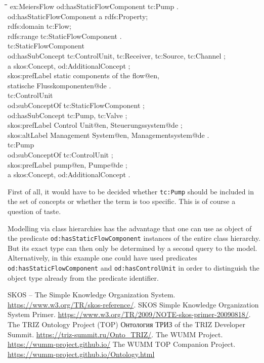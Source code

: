 \documentclass[11pt,a4paper]{article}
\newenvironment{code}{\tt \begin{tabbing}
\hskip12pt\=\hskip12pt\=\hskip12pt\=\hskip12pt\=\hskip5cm\=\hskip5cm\=\kill}
{\end{tabbing}}
\def\dq{{\char34}}
\begin{document}
\begin{code}
  ex:MeiersFlow od:hasStaticFlowComponent tc:Pump . \\[4pt]
  
od:hasStaticFlowComponent a rdfs:Property;\\
    \>rdfs:domain tc:Flow;\\
    \>rdfs:range tc:StaticFlowComponent .\\[4pt]
  
tc:StaticFlowComponent\\
    \>od:hasSubConcept tc:ControlUnit, tc:Receiver, tc:Source, tc:Channel ;\\
    \>a skos:Concept, od:AdditionalConcept ;\\
    \>skos:prefLabel {\dq}static components of the flow{\dq}@en,\\
    \>\>{\dq}statische Flusskomponenten{\dq}@de .\\[4pt]

tc:ControlUnit\\
    \>od:subConceptOf tc:StaticFlowComponent ;\\
    \>od:hasSubConcept tc:Pump, tc:Valve ;\\
    \>skos:prefLabel {\dq}Control Unit{\dq}@en, {\dq}Steuerungssystem{\dq}@de ;\\
    \>skos:altLabel {\dq}Management System{\dq}@en, {\dq}Managementsystem{\dq}@de .\\[4pt]

tc:Pump\\
    \>od:subConceptOf tc:ControlUnit ;\\
    \>skos:prefLabel {\dq}pump{\dq}@en, {\dq}Pumpe{\dq}@de ;\\
    \>a skos:Concept, od:AdditionalConcept .
\end{code}

First of all, it would have to be decided whether \texttt{tc:Pump} should be
included in the set of concepts or whether the term is too specific.  This is
of course a question of taste.

Modelling via class hierarchies has the advantage that one can use as object
of the predicate \texttt{od:hasStaticFlowComponent} instances of the entire
class hierarchy. But its exact type can then only be determined by a second
query to the model.  Alternatively, in this example one could have used
predicates \texttt{od:hasStaticFlowComponent} and \texttt{od:hasControlUnit}
in order to distinguish the object type already from the predicate identifier.


\begin{thebibliography}{xxx}
\raggedright
{} SKOS -- The Simple Knowledge Organization System.
  \url{https://www.w3.org/TR/skos-reference/}.  
 SKOS Simple Knowledge Organization System Primer.
  \url{https://www.w3.org/TR/2009/NOTE-skos-primer-20090818/}.  
 The TRIZ Ontology Project (TOP)
  \foreignlanguage{russian}{Онтология ТРИЗ} of the TRIZ Developer Summit.
  \url{https://triz-summit.ru/Onto_TRIZ/}.
 The WUMM Project. \url{https://wumm-project.github.io/} 
 The WUMM TOP Companion Project.
  \url{https://wumm-project.github.io/Ontology.html} 
\end{thebibliography}
\end{document}
